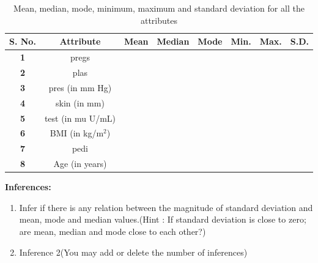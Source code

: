 \documentclass[12 pt, a4paper]{article}
\theoremstyle{definition}
\begin{document}
\section{}
\begin{table}[H]
	\caption{Mean, median, mode, minimum, maximum and standard deviation for all the attributes}
	\label{tab:Database}
	\centering
	\begin{tabular}{|c|c|c|c|c|c|c|c|}
	\hline
		\textbf{S. No.}& \textbf{Attribute} & \textbf{Mean} & \textbf{Median} & \textbf{Mode}&\textbf{Min.} &\textbf{Max.}&\textbf{S.D.} \\ \hline
		
		\textbf{1}          & pregs          &         &         &   & &&                \\ \hline
		\textbf{2}           & plas            &         &         &   &  &&               \\ \hline
		\textbf{3}          & pres (in mm Hg)          &         &         &   &        &&        \\ \hline
		\textbf{4}       & skin (in mm)         &         &         &   &           &&    \\ \hline
		\textbf{5}           & test (in mu U/mL)           &         &         &   &     &&          \\ \hline
			\textbf{6}           & BMI (in kg/m$^{2 }$)           &         &         &   &     &&          \\ \hline
		\textbf{7}          & pedi          &    &&     &         &   &                \\ \hline
		\textbf{8}       & Age (in years)          &   &&      &         &   &               \\ \hline
	
		
	\end{tabular}
\end{table}

\textbf{\Large Inferences:}
\begin{enumerate}
   \item Infer if there is any relation between the magnitude of standard deviation and mean, mode and median values.(Hint : If standard deviation is close to zero; are mean, median and mode close to each other?)
   \item Inference 2(You may add or delete the number of inferences)
\end{enumerate}
\end{document}

